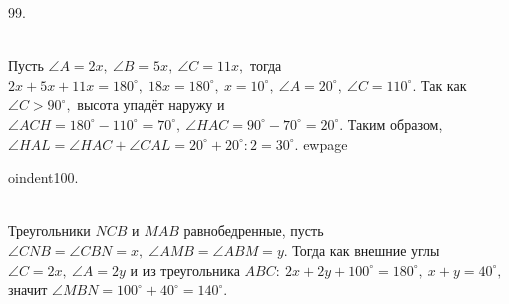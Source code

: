 99.\begin{figure}[ht!]
\end{figure}\\
Пусть $\angle A=2x,\ \angle B=5x,\ \angle C=11x,$ тогда $2x+5x+11x=180^\circ,\ 18x=180^\circ,\ x=10^\circ,\ \angle A=20^\circ,\ \angle C=110^\circ.$ Так как $\angle C>90^\circ,$ высота упадёт наружу и  $\angle ACH=180^\circ-110^\circ=70^\circ,\ \angle HAC=90^\circ-70^\circ=20^\circ.$ Таким образом, $\angle HAL=\angle HAC+\angle CAL=20^\circ+20^\circ:2=30^\circ.$
ewpage

oindent100. \begin{figure}[ht!]
\end{figure}\\
Треугольники $NCB$ и $MAB$ равнобедренные, пусть $\angle CNB=\angle CBN=x,\ \angle AMB=\angle ABM=y.$ Тогда как внешние углы $\angle C=2x,\ \angle A=2y$ и из треугольника $ABC:\ 2x+2y+100^\circ=180^\circ,\ x+y=40^\circ,$ значит $\angle MBN=100^\circ+40^\circ=140^\circ.$\\
